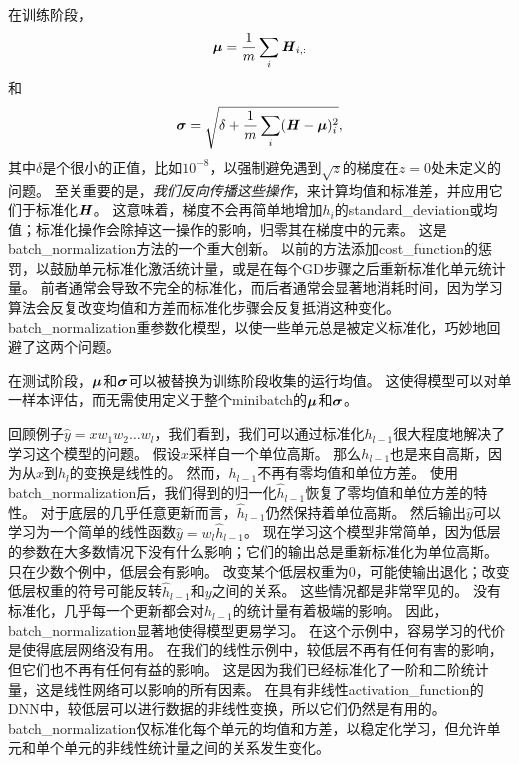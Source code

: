 在训练阶段，
\begin{equation}
    \boldsymbol{\mu} = \frac{1}{m} \sum_i \boldsymbol{\mathit{H}}_{i,:}
\end{equation}
和
\begin{equation}
    \boldsymbol{\sigma} = \sqrt{ \delta + \frac{1}{m} \sum_i (\boldsymbol{\mathit{H}} - \boldsymbol{\mu})_i^2 },
\end{equation}
其中$\delta$是个很小的正值，比如$10^{-8}$，以强制避免遇到$\sqrt{z}$的梯度在$z=0$处未定义的问题。
至关重要的是，\emph{我们反向传播这些操作}，来计算均值和标准差，并应用它们于标准化$\boldsymbol{\mathit{H}}$。
这意味着，梯度不会再简单地增加$h_i$的\gls{standard_deviation}或均值；标准化操作会除掉这一操作的影响，归零其在梯度中的元素。
这是\gls{batch_normalization}方法的一个重大创新。
以前的方法添加\gls{cost_function}的惩罚，以鼓励单元标准化激活统计量，或是在每个\gls{GD}步骤之后重新标准化单元统计量。
前者通常会导致不完全的标准化，而后者通常会显著地消耗时间，因为学习算法会反复改变均值和方差而标准化步骤会反复抵消这种变化。
\gls{batch_normalization}重参数化模型，以使一些单元总是被定义标准化，巧妙地回避了这两个问题。


在测试阶段，$\boldsymbol{\mu}$和$\boldsymbol{\sigma}$可以被替换为训练阶段收集的运行均值。
这使得模型可以对单一样本评估，而无需使用定义于整个\gls{minibatch}的$\boldsymbol{\mu}$和$\boldsymbol{\sigma}$。

回顾例子$\hat{y} = x w_1 w_2 \dots w_l$，我们看到，我们可以通过标准化$h_{l-1}$很大程度地解决了学习这个模型的问题。
假设$x$采样自一个单位高斯。
那么$h_{l-1}$也是来自高斯，因为从$x$到$h_l$的变换是线性的。
然而，$h_{l-1}$不再有零均值和单位方差。
使用\gls{batch_normalization}后，我们得到的归一化$\hat{h}_{l-1}$恢复了零均值和单位方差的特性。
对于底层的几乎任意更新而言，$\hat{h}_{l-1}$仍然保持着单位高斯。
然后输出$\hat{y}$可以学习为一个简单的线性函数$\hat{y} = w_l \hat{h}_{l-1}$。
现在学习这个模型非常简单，因为低层的参数在大多数情况下没有什么影响；它们的输出总是重新标准化为单位高斯。
只在少数个例中，低层会有影响。
改变某个低层权重为$0$，可能使输出退化；改变低层权重的符号可能反转$\hat{h}_{l-1}$和$y$之间的关系。
这些情况都是非常罕见的。
没有标准化，几乎每一个更新都会对$h_{l-1}$的统计量有着极端的影响。
因此，\gls{batch_normalization}显著地使得模型更易学习。
在这个示例中，容易学习的代价是使得底层网络没有用。
在我们的线性示例中，较低层不再有任何有害的影响，但它们也不再有任何有益的影响。
这是因为我们已经标准化了一阶和二阶统计量，这是线性网络可以影响的所有因素。
在具有非线性\gls{activation_function}的\gls{DNN}中，较低层可以进行数据的非线性变换，所以它们仍然是有用的。
\gls{batch_normalization}仅标准化每个单元的均值和方差，以稳定化学习，但允许单元和单个单元的非线性统计量之间的关系发生变化。

